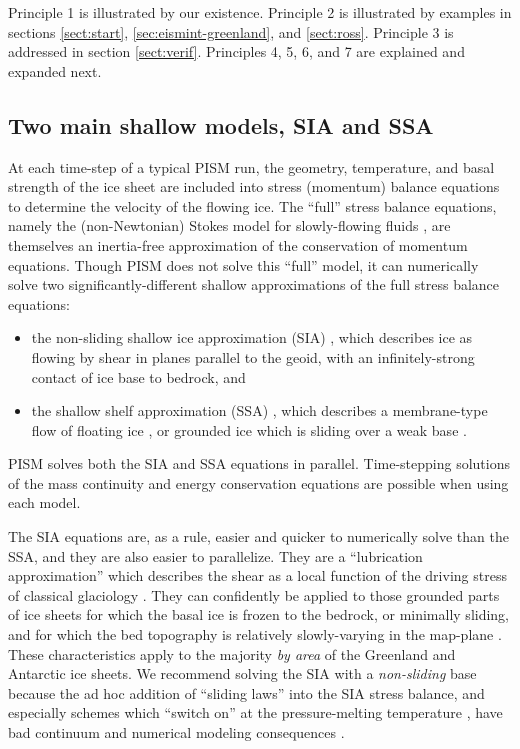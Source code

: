 \documentclass[titlepage,letterpaper,final]{scrartcl}
\begin{document}
Principle 1 is illustrated by our existence.  Principle 2 is illustrated by examples in sections \ref{sect:start}, \ref{sec:eismint-greenland}, and \ref{sect:ross}.  Principle 3 is addressed in section \ref{sect:verif}.  Principles 4, 5, 6, and 7 are explained and expanded next.


\subsection{Two main shallow models, SIA and SSA}  At each time-step of a typical PISM run, the geometry, temperature, and basal strength of the ice sheet are included into stress (momentum) balance equations to determine the velocity of the flowing ice.   The ``full'' stress balance equations, namely the (non-Newtonian) Stokes model for slowly-flowing fluids \cite{Fowler}, are themselves an inertia-free approximation of the conservation of momentum equations.  Though PISM does not solve this ``full'' model, it can numerically solve two significantly-different shallow approximations of the full stress balance equations:\begin{itemize}
\item the non-sliding shallow ice approximation (SIA) \cite{Hutter}, which describes ice as flowing by shear in planes parallel to the geoid, with an infinitely-strong contact of ice base to bedrock, and
\item the shallow shelf approximation (SSA) \cite{WeisGreveHutter}, which describes a membrane-type flow of floating ice \cite{Morland}, or grounded ice which is sliding over a weak base \cite{MacAyeal,SchoofStream}.
\end{itemize}
PISM solves both the SIA and SSA equations in parallel.  Time-stepping solutions of the mass continuity and energy conservation equations are possible when using each model.

The SIA equations are, as a rule, easier and quicker to numerically solve than the SSA, and they are also easier to parallelize.  They are a ``lubrication approximation'' \cite{Fowler} which describes the shear as a local function of the driving stress of classical glaciology \cite{Paterson}.  They can confidently be applied to those grounded parts of ice sheets for which the basal ice is frozen to the bedrock, or minimally sliding, and for which the bed topography is relatively slowly-varying in the map-plane \cite{Fowler}.  These characteristics apply to the majority \emph{by area} of the Greenland and Antarctic ice sheets.  We recommend solving the SIA with a \emph{non-sliding} base because the ad hoc addition of ``sliding laws'' into the SIA stress balance, and especially schemes which ``switch on'' at the pressure-melting temperature \cite{EISMINT00}, have bad continuum and numerical modeling consequences \cite[appendix B]{BBssasliding}.
\end{document}
